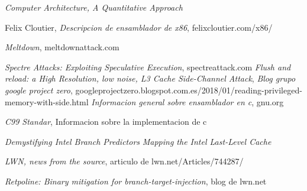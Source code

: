 \documentclass[paper=a4, fontsize=11pt]{scrartcl} %
\begin{document}
\begin{thebibliography}{99}

    \textit{Computer Architecture, A Quantitative Approach}

  Felix Cloutier,
  \textit{Descripcion de ensamblador de x86},
  felixcloutier.com/x86/

    \textit{Meltdown},
    meltdownattack.com

    \textit{Spectre Attacks: Exploiting Speculative Execution},
    spectreattack.com
    \textit{Flush and reload: a High Resolution, low noise, L3 Cache Side-Channel Attack},
    \textit{Blog grupo google project zero},
    googleprojectzero.blogspot.com.es/2018/01/reading-privileged-memory-with-side.html
    \textit{Informacion general sobre ensamblador en c},
    gnu.org

    \textit{C99 Standar},
    Informacion sobre la implementacion de c

    \textit{Demystifying Intel Branch Predictors }
    \textit{Mapping the Intel Last-Level Cache}

    \textit{LWN, news from the source},
    articulo de lwn.net/Articles/744287/

    \textit{Retpoline: Binary mitigation for branch-target-injection},
    blog de lwn.net

\end{thebibliography}
\end{document}
